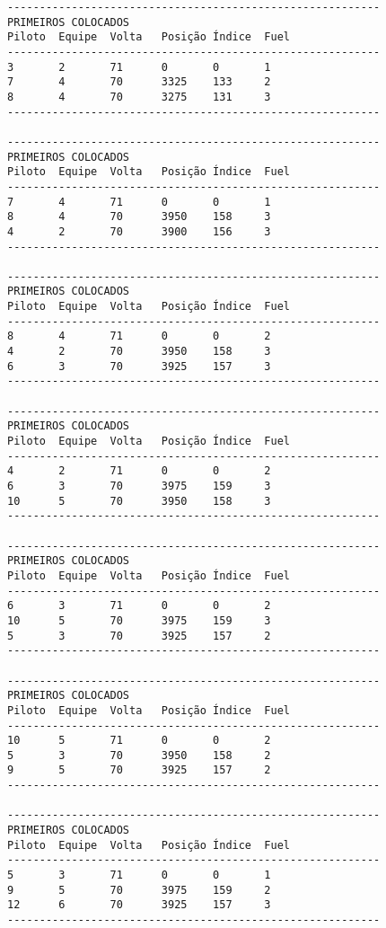 \documentclass[12pt]{article}
\begin{document}
\begin{verbatim}
----------------------------------------------------------
PRIMEIROS COLOCADOS
Piloto  Equipe  Volta   Posição Índice  Fuel
----------------------------------------------------------
3       2       71      0       0       1
7       4       70      3325    133     2
8       4       70      3275    131     3
----------------------------------------------------------

----------------------------------------------------------
PRIMEIROS COLOCADOS
Piloto  Equipe  Volta   Posição Índice  Fuel
----------------------------------------------------------
7       4       71      0       0       1
8       4       70      3950    158     3
4       2       70      3900    156     3
----------------------------------------------------------

----------------------------------------------------------
PRIMEIROS COLOCADOS
Piloto  Equipe  Volta   Posição Índice  Fuel
----------------------------------------------------------
8       4       71      0       0       2
4       2       70      3950    158     3
6       3       70      3925    157     3
----------------------------------------------------------

----------------------------------------------------------
PRIMEIROS COLOCADOS
Piloto  Equipe  Volta   Posição Índice  Fuel
----------------------------------------------------------
4       2       71      0       0       2
6       3       70      3975    159     3
10      5       70      3950    158     3
----------------------------------------------------------

----------------------------------------------------------
PRIMEIROS COLOCADOS
Piloto  Equipe  Volta   Posição Índice  Fuel
----------------------------------------------------------
6       3       71      0       0       2
10      5       70      3975    159     3
5       3       70      3925    157     2
----------------------------------------------------------

----------------------------------------------------------
PRIMEIROS COLOCADOS
Piloto  Equipe  Volta   Posição Índice  Fuel
----------------------------------------------------------
10      5       71      0       0       2
5       3       70      3950    158     2
9       5       70      3925    157     2
----------------------------------------------------------

----------------------------------------------------------
PRIMEIROS COLOCADOS
Piloto  Equipe  Volta   Posição Índice  Fuel
----------------------------------------------------------
5       3       71      0       0       1
9       5       70      3975    159     2
12      6       70      3925    157     3
----------------------------------------------------------


\end{verbatim}
\end{document}
